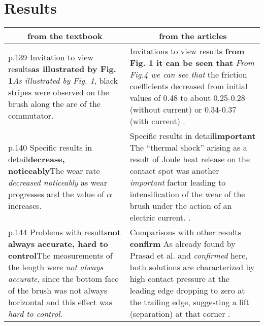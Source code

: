 \documentclass[12pt]{article}
\begin{document}
\section{Results}
	\begin{longtable}{|p{}|p{}|}
		\hline
		\multicolumn{1}{|c|}{from the textbook}&\multicolumn{1}{c|}{from the articles}\\
		\hline
		\ding{174} p.139 Invitation to view results\newline \textbf{as illustrated by Fig. 1}\newline \emph{As illustrated by Fig. 1}, black stripes were observed on the brush along the arc of the commutator.& \ding{174} Invitations to view results \newline \textbf{from Fig. 1 it can be seen that} \newline \emph{From Fig.4 we can see that} the friction coefficients decreased from initial values of 0.48 to about 0.25-0.28 (without current) or 0.34-0.37 (with current) \cite{intro2}.\\
		\hline
		\ding{175} p.140 Specific results in detail\newline \textbf{decrease, noticeably}\newline The wear rate \emph{decreased noticeably} as wear progresses and the value of $\alpha$ increases. & \ding{175} Specific results in detail\newline \textbf{important} \newline The ``thermal shock'' arising as a result of Joule heat release on the contact spot was another \emph{important} factor leading to intensification of the wear of the brush under the action of an electric current. \cite{intro2}.\\
		\hline
		\ding{177} p.144 Problems with results\newline \textbf{not always accurate, hard to control}\newline The measurements of the length were \emph{not always accurate}, since the bottom face of the brush was not always horizontal and this effect was \emph{hard to control}.& \ding{176} Comparisons with other results \newline \textbf{confirm} \newline As already found by Prasad et al. and \emph{confirmed}
		here, both solutions are characterized by high contact pressure
		at the leading edge dropping to zero at the trailing edge, suggesting a lift (separation) at that corner \cite{res3}.\\
		\hline
	\end{longtable}
\end{document}
